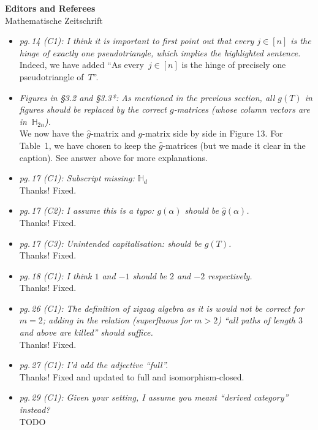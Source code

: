 \documentclass{letter}
\begin{document}
\begin{letter}{{\bf Editors and Referees} \\ Mathematische Zeitschrift}
\begin{itemize}
\item \textsl{\color{gray} pg.\,14 (C1): I think it is important to first point out that every $j \in [n]$ is the hinge of exactly one pseudotriangle, which implies the highlighted sentence.} \\
Indeed, we have added ``As every~$j \in [n]$ is the hinge of precisely one pseudotriangle of~$T$''.

\item \textsl{\color{gray} Figures in §3.2 and §3.3*: As mentioned in the previous section, all $g(T)$ in figures should be replaced by the correct $g$-matrices (whose column vectors are in~$\mathbb{H}_{2n}$).} \\
We now have the $\hat{g}$-matrix and $g$-matrix side by side in Figure 13. For Table~1, we have chosen to keep the $\hat{g}$-matrices (but we made it clear in the caption). See answer above for more explanations.

\item \textsl{\color{gray} pg.\,17 (C1): Subscript missing: $\mathbb{H}_d$} \\
Thanks! Fixed.

\item \textsl{\color{gray} pg.\,17 (C2): I assume this is a typo: $g(\alpha)$ should be $\hat{g}(\alpha)$.} \\
Thanks! Fixed.

\item \textsl{\color{gray} pg.\,17 (C3): Unintended capitalisation: should be $g(T)$.} \\
Thanks! Fixed.

\item \textsl{\color{gray} pg.\,18 (C1): I think $1$ and $-1$ should be $2$ and $-2$ respectively.} \\
Thanks! Fixed.

\item \textsl{\color{gray} pg.\,26 (C1): The definition of zigzag algebra as it is would not be correct for $m = 2$; adding in the relation (superfluous for $m > 2$) ``all paths of length $3$ and above are killed'' should suffice.} \\
Thanks! Fixed.

\item \textsl{\color{gray} pg.\,27 (C1): I'd add the adjective ``full''.} \\
Thanks! Fixed and updated to full and isomorphism-closed.

\item \textsl{\color{gray} pg.\,29 (C1): Given your setting, I assume you meant ``derived category'' instead?} \\
TODO


\end{itemize}
\end{letter}
\end{document}
